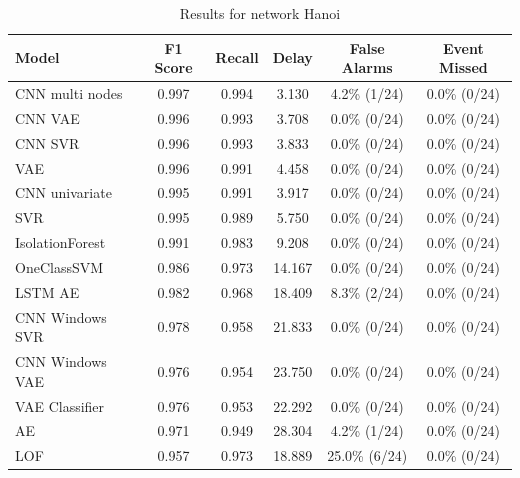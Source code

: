 \begin{table}
\caption{Results for network Hanoi}
\label{tab:results-Hanoi}
\begin{tabular}{lccccc}
\toprule
Model & F1 Score & Recall & Delay & False Alarms & Event Missed \\
\midrule
CNN multi nodes & 0.997 & 0.994 & 3.130 & 4.2\% (1/24) & 0.0\% (0/24) \\
CNN VAE & 0.996 & 0.993 & 3.708 & 0.0\% (0/24) & 0.0\% (0/24) \\
CNN SVR & 0.996 & 0.993 & 3.833 & 0.0\% (0/24) & 0.0\% (0/24) \\
VAE & 0.996 & 0.991 & 4.458 & 0.0\% (0/24) & 0.0\% (0/24) \\
CNN univariate & 0.995 & 0.991 & 3.917 & 0.0\% (0/24) & 0.0\% (0/24) \\
SVR & 0.995 & 0.989 & 5.750 & 0.0\% (0/24) & 0.0\% (0/24) \\
IsolationForest & 0.991 & 0.983 & 9.208 & 0.0\% (0/24) & 0.0\% (0/24) \\
OneClassSVM & 0.986 & 0.973 & 14.167 & 0.0\% (0/24) & 0.0\% (0/24) \\
LSTM AE & 0.982 & 0.968 & 18.409 & 8.3\% (2/24) & 0.0\% (0/24) \\
CNN Windows SVR & 0.978 & 0.958 & 21.833 & 0.0\% (0/24) & 0.0\% (0/24) \\
CNN Windows VAE & 0.976 & 0.954 & 23.750 & 0.0\% (0/24) & 0.0\% (0/24) \\
VAE Classifier & 0.976 & 0.953 & 22.292 & 0.0\% (0/24) & 0.0\% (0/24) \\
AE & 0.971 & 0.949 & 28.304 & 4.2\% (1/24) & 0.0\% (0/24) \\
LOF & 0.957 & 0.973 & 18.889 & 25.0\% (6/24) & 0.0\% (0/24) \\
\bottomrule
\end{tabular}
\end{table}
